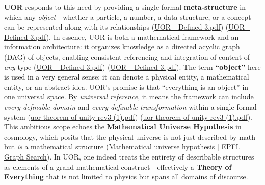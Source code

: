 \documentclass[12pt]{article}
\begin{document}
\noindent \textbf{UOR} responds to this need by providing a single formal \textbf{meta-structure} in which any \emph{object}---whether a particle, a number, a data structure, or a concept---can be represented along with its relationships (\href{file://file-3oEyMHjK5WgHWfYmLyzhts#:~:text=Introduction%3A%20The%20Universal%20Object%20Reference,Originally%20formulated%20in%20computational%20and}{UOR\_ Defined 3.pdf}) (\href{file://file-3oEyMHjK5WgHWfYmLyzhts#:~:text=information%20as%20a%20directed%20acyclic,solving%20in%20each}{UOR\_ Defined 3.pdf}). In essence, UOR is both a mathematical framework and an information architecture: it organizes knowledge as a directed acyclic graph (DAG) of objects, enabling consistent referencing and integration of content of \emph{any} type (\href{file://file-3oEyMHjK5WgHWfYmLyzhts#:~:text=%28UOR,of%20objects%2C%20enabling%20consistent}{UOR\_ Defined 3.pdf}) (\href{file://file-3oEyMHjK5WgHWfYmLyzhts#:~:text=integration,solving%20in%20each}{UOR\_ Defined 3.pdf}). The term \textbf{``object''} here is used in a very general sense: it can denote a physical entity, a mathematical entity, or an abstract idea. UOR’s promise is that ``everything is an object'' in one universal space. By \emph{universal reference}, it means the framework can include \emph{every definable domain} and \emph{every definable transformation} within a single formal system (\href{file://file-CJBWhjR1XERgfPCpnf5UAs#:~:text=A%20unified%20framework%20is%20presented,in%20which%20pairs%20of%20elements}{uor-theorem-of-unity-rev3 (1).pdf}) (\href{file://file-CJBWhjR1XERgfPCpnf5UAs#:~:text=Examples,symmetric%20Hamiltonians}{uor-theorem-of-unity-rev3 (1).pdf}). This ambitious scope echoes the \textbf{Mathematical Universe Hypothesis} in cosmology, which posits that the physical universe is not just described by math but \emph{is} a mathematical structure (\href{https://graphsearch.epfl.ch/concept/2148329#:~:text=In%20physics%20and%20cosmology%2C%20the,will}{Mathematical universe hypothesis | EPFL Graph Search}). In UOR, one indeed treats the entirety of describable structures as elements of a grand mathematical construct---effectively a \textbf{Theory of Everything} that is not limited to physics but spans all domains of discourse.

\bigskip
\end{document}
